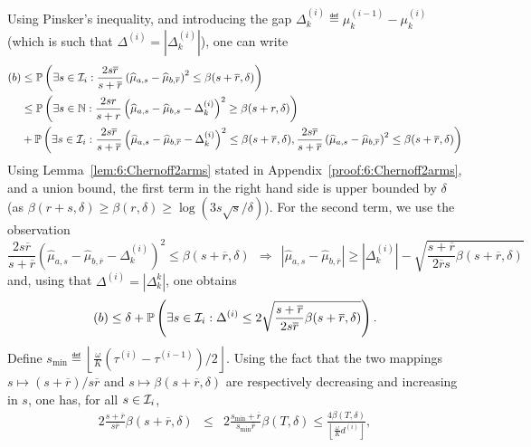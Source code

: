 Using Pinsker's inequality, and introducing the gap $\Delta_k^{(i)} \eqdef \mu_k^{(i-1)} - {\mu}_k^{(i)}$ (which is such that $\Delta^{(i)} = |\Delta_k^{(i)}|$), one can write
%
\begin{align}
    (b) & \leq \mathbb{P}\left(\exists s \in \mathcal{I}_{i} : \frac{2s\overline{r}}{s+\overline{r}}\left(\widehat{\mu}_{a,s} - \widehat{\mu}_{b,\overline{r}} \right)^2  \leq \beta(s+\overline{r},\delta)\right)\nonumber\\
    & \leq \mathbb{P}\left(\exists s \in \mathbb{N} : \frac{2sr}{s+r}\left(\widehat{\mu}_{a,s} - \widehat{\mu}_{b,s} - \Delta_k^{(i)}\right)^2  \geq \beta(s+r,\delta)\right) \nonumber\\
    & + \mathbb{P}\left(\exists s \in \mathcal{I}_{i} : \frac{2s\overline{r}}{s+\overline{r}}\left(\widehat{\mu}_{a,s} - \widehat{\mu}_{b,\overline{r}} - \Delta_k^{(i)}\right)^2  \leq \beta(s+\overline{r},\delta), \frac{2s\overline{r}}{s+\overline{r}}\left(\widehat{\mu}_{a,s} - \widehat{\mu}_{b,\overline{r}}\right)^2  \leq \beta(s+\overline{r},\delta)\right) \nonumber
\end{align}
%
Using Lemma~\ref{lem:6:Chernoff2arms} stated in Appendix~\ref{proof:6:Chernoff2arms}, and a union bound, the first term in the right hand side is upper bounded by $\delta$ (as $\beta(r+s,\delta) \geq \beta(r,\delta) \geq \log(3s\sqrt{s}/\delta)$). For the second term, we use the observation
\[\frac{2s\overline{r}}{s+\overline{r}}\left(\widehat{\mu}_{a,s} - \widehat{\mu}_{b,\overline{r}} - \Delta_k^{(i)}\right)^2  \leq \beta(s+\overline{r},\delta) \ \ \Rightarrow \ \ |\widehat{\mu}_{a,s} - \widehat{\mu}_{b,\overline{r}}| \geq |\Delta_k^{(i)}| - \sqrt{\frac{s+\overline{r}}{2\overline{r}s}\beta(s+\overline{r},\delta)}\]
and, using that $\Delta^{(i)} = |\Delta_k^k|$, one obtains
%
\begin{equation}\label{eq:6:FromHereGlobal}
    (b) \leq \delta + \mathbb{P}\left(\exists s \in \mathcal{I}_{i} : \Delta^{(i)} \leq 2\sqrt{\frac{s+\overline{r}}{2s\overline{r}}\beta(s+\overline{r},\delta)}\right).
\end{equation}
%
Define $s_{\min} \eqdef \left\lfloor \frac{\omega}{K} (\tau^{(i)}-\tau^{(i-1)})/2\right\rfloor$. Using the fact that the two mappings $s \mapsto (s+\overline{r})/s\overline{r}$ and $s \mapsto \beta(s + \overline{r},\delta)$ are respectively decreasing and increasing in $s$, one has, for all $s\in \mathcal{I}_{i}$,
\begin{eqnarray*}
    2\frac{s+\overline{r}}{s\overline{r}}\beta\left(s+\overline{r}, \delta\right) & \leq &
    2\frac{s_{\min}+\overline{r}}{s_{\min}\overline{r}}\beta\left(T, \delta\right) \leq \frac{4\beta(T,\delta)}{\left\lfloor \frac{\omega}{K}d^{(i)}\right\rfloor},
\end{eqnarray*}
